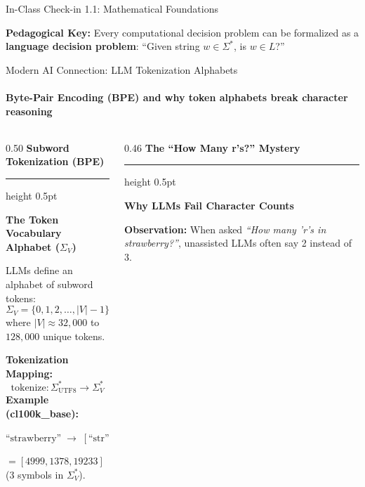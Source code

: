 \documentclass[aspectratio=169, 10pt]{beamer}
\newcommand{\colheader}[1]{%
  {\noindent\footnotesize\bfseries\color{gimpanavy}#1}%
  \vspace{0.02cm}%
  {\color{gimpanavy!30}\hrule height 0.5pt}%
  \vspace{0.05cm}%
}
\newcommand{\cardtitle}[1]{{\noindent\footnotesize\bfseries\color{gimpanavy}#1}\par\vspace{0.03cm}}
\newcommand{\alerttitle}[1]{{\noindent\footnotesize\bfseries\color{accentCrimson}#1}\par\vspace{0.03cm}}
\begin{document}
\begin{frame}{In-Class Check-in 1.1: Mathematical Foundations}
  \vspace{0.10cm}
  \begin{tcolorbox}[spotlightcard]
    {\scriptsize\textbf{Pedagogical Key:} Every computational decision problem can be formalized as a \textbf{language decision problem}: ``Given string $w \in \Sigma^*$, is $w \in L$?''}
  \end{tcolorbox}
\end{frame}

\begin{frame}{Modern AI Connection: LLM Tokenization Alphabets}
  \framesubtitle{Byte-Pair Encoding (BPE) and why token alphabets break character reasoning}
  
  \begin{columns}[T]
    \begin{column}{0.50\textwidth}
      \colheader{Subword Tokenization (BPE)}
      \begin{tcolorbox}[conceptcard]
        \cardtitle{The Token Vocabulary Alphabet ($\Sigma_V$)}
        {\scriptsize
        LLMs define an alphabet of subword tokens:
        \[ \Sigma_V = \{0, 1, 2, \dots, |V|-1\} \]
        where $|V| \approx 32{,}000$ to $128{,}000$ unique tokens.
        \vspace{0.03cm}
        
        \textbf{Tokenization Mapping:}
        \[ \text{tokenize}: \Sigma_{\text{UTF8}}^* \to \Sigma_V^* \]
        \textbf{Example (cl100k\_base):}\par
        $\text{``strawberry''} \;\longrightarrow\; [\text{``str''}, \text{``aw''}, \text{``berry''}]$\par
        $= [4999, 1378, 19233]$ ($3$ symbols in $\Sigma_V^*$).
        }
      \end{tcolorbox}
    \end{column}
    
    \begin{column}{0.46\textwidth}
      \colheader{The ``How Many r's?'' Mystery}
      \begin{tcolorbox}[alertcard]
        \alerttitle{Why LLMs Fail Character Counts}
        {\scriptsize
        \textbf{Observation:} When asked \textit{``How many 'r's in strawberry?''}, unassisted LLMs often say 2 instead of 3.
        \vspace{0.03cm}
        
}
\end{tcolorbox}
\end{column}
\end{columns}
\end{frame}
\end{document}

